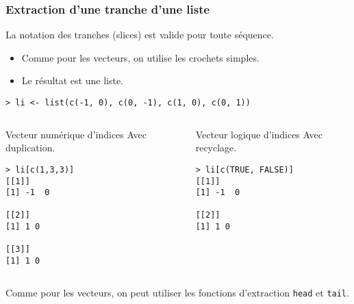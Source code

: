 \documentclass[10pt]{beamer}
\begin{document}
\begin{frame}[fragile]
  \frametitle{Extraction d'une tranche d'une liste}
  La notation des tranches (\alert{slices}) est valide pour toute séquence. \\
  \begin{itemize}
  \item Comme pour les vecteurs, on utilise les \alert{crochets simples}.
  \item Le résultat est une liste.
  \end{itemize}

    \begin{lstlisting}
> li <- list(c(-1, 0), c(0, -1), c(1, 0), c(0, 1)) 
\end{lstlisting}    

\vspace{-15pt}
\begin{columns}[t]
\begin{column}{0.48\textwidth}
  \begin{exampleblock}{Vecteur numérique d’indices}
    Avec duplication.
    \begin{lstlisting}
> li[c(1,3,3)]
[[1]]
[1] -1  0

[[2]]
[1] 1 0

[[3]]
[1] 1 0
\end{lstlisting}    
  \end{exampleblock}
\end{column}
\begin{column}{0.48\textwidth}
  \begin{exampleblock}{Vecteur logique d’indices}
    Avec recyclage.
    \begin{lstlisting}
> li[c(TRUE, FALSE)]
[[1]]
[1] -1  0

[[2]]
[1] 1 0
\end{lstlisting}    
  \end{exampleblock}

\end{column}
\end{columns}
Comme pour les vecteurs, on peut utiliser les fonctions d'extraction \texttt{head} et \texttt{tail}.


\end{frame}
\end{document}
